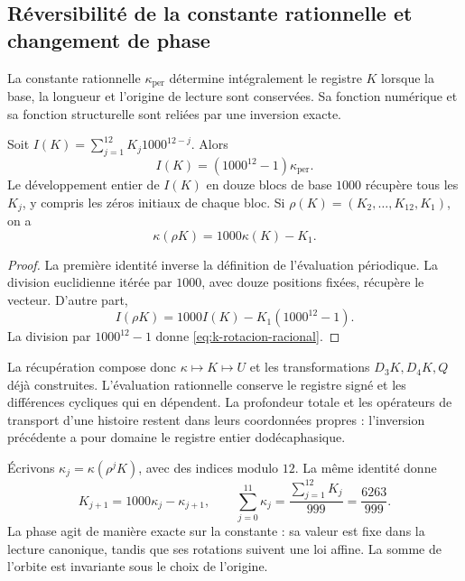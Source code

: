 \subsection{Réversibilité de la constante rationnelle et changement de phase}

La constante rationnelle \(\kappa_{\mathrm{per}}\) détermine intégralement
le registre \(K\) lorsque la base, la longueur et l'origine
de lecture sont conservées. Sa fonction numérique et sa fonction structurelle sont reliées
par une inversion exacte.

\begin{proposition}
Soit \(I(K)=\sum_{j=1}^{12}K_j1000^{12-j}\). Alors
\[
 I(K)=(1000^{12}-1)\kappa_{\mathrm{per}}.
\]
Le développement entier de \(I(K)\) en douze blocs de base \(1000\)
récupère tous les \(K_j\), y compris les zéros initiaux de chaque bloc.
Si \(\rho(K)=(K_2,\ldots,K_{12},K_1)\), on a
\begin{equation}
 \kappa(\rho K)=1000\kappa(K)-K_1.
 \label{eq:k-rotacion-racional}
\end{equation}
\end{proposition}
\begin{proof}
La première identité inverse la définition de l'évaluation périodique.
La division euclidienne itérée par \(1000\), avec douze positions fixées,
récupère le vecteur. D'autre part,
\[
 I(\rho K)=1000I(K)-K_1(1000^{12}-1).
\]
La division par \(1000^{12}-1\) donne \eqref{eq:k-rotacion-racional}.
\end{proof}

La récupération compose donc \(\kappa\mapsto K\mapsto U\)
et les transformations \(D_3K,D_4K,Q\) déjà construites. L'évaluation
rationnelle conserve le registre signé et les différences cycliques qui
en dépendent. La profondeur totale et les opérateurs de transport d'une
histoire restent dans leurs coordonnées propres : l'inversion précédente
a pour domaine le registre entier dodécaphasique.

Écrivons \(\kappa_j=\kappa(\rho^jK)\), avec des indices modulo \(12\).
La même identité donne
\[
 K_{j+1}=1000\kappa_j-\kappa_{j+1},\qquad
 \sum_{j=0}^{11}\kappa_j=\frac{\sum_{j=1}^{12}K_j}{999}
 =\frac{6263}{999}.
\]
La phase agit de manière exacte sur la constante : sa valeur est fixe
dans la lecture canonique, tandis que ses rotations suivent une loi affine.
La somme de l'orbite est invariante sous le choix de l'origine.


